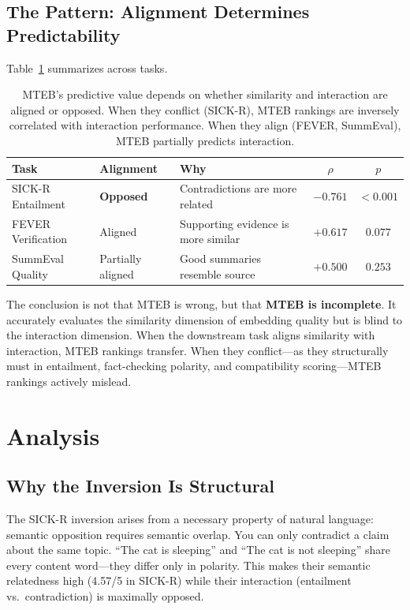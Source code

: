 \documentclass{article}
\begin{document}
\subsection{The Pattern: Alignment Determines Predictability}

Table~\ref{tab:pattern} summarizes across tasks.

\begin{table}[t]
\centering
\caption{MTEB's predictive value depends on whether similarity and interaction are aligned or opposed. When they conflict (SICK-R), MTEB rankings are inversely correlated with interaction performance. When they align (FEVER, SummEval), MTEB partially predicts interaction.}
\label{tab:pattern}
\small
\begin{tabular}{@{}lllcc@{}}
\toprule
\textbf{Task} & \textbf{Alignment} & \textbf{Why} & $\rho$ & $p$ \\
\midrule
SICK-R Entailment & \textbf{Opposed} & Contradictions are more related & $-0.761$ & $<0.001$ \\
FEVER Verification & Aligned & Supporting evidence is more similar & $+0.617$ & $0.077$ \\
SummEval Quality & Partially aligned & Good summaries resemble source & $+0.500$ & $0.253$ \\
\bottomrule
\end{tabular}
\end{table}

The conclusion is not that MTEB is wrong, but that \textbf{MTEB is incomplete}. It accurately evaluates the similarity dimension of embedding quality but is blind to the interaction dimension. When the downstream task aligns similarity with interaction, MTEB rankings transfer. When they conflict---as they structurally must in entailment, fact-checking polarity, and compatibility scoring---MTEB rankings actively mislead.

\section{Analysis}
\label{sec:analysis}

\subsection{Why the Inversion Is Structural}

The SICK-R inversion arises from a necessary property of natural language: semantic opposition requires semantic overlap. You can only contradict a claim about the same topic. ``The cat is sleeping'' and ``The cat is not sleeping'' share every content word---they differ only in polarity. This makes their semantic relatedness high (4.57/5 in SICK-R) while their interaction (entailment vs.\ contradiction) is maximally opposed.
\end{document}
